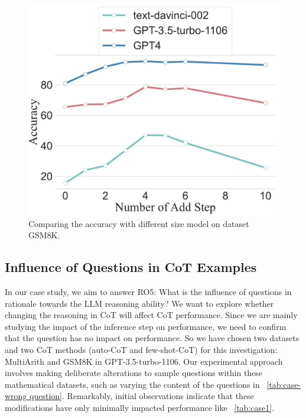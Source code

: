 \documentclass[11pt]{article}
\begin{document}
\begin{figure}[t]
    \centering
    \includegraphics[width=0.75\linewidth]{DIFF_MODEL.pdf}

    \caption{Comparing the accuracy with different size model on dataset GSM8K.}
    \label{diff_model}

\end{figure}


\phantom{Invisible Text}
\vspace{-\baselineskip}

\subsection{Influence of Questions in CoT Examples}

\label{section4.6}

In our case study, we aim to answer RO5: What is the influence of questions in rationale towards the LLM reasoning ability? We want to explore whether changing the reasoning in CoT will affect CoT performance. Since we are mainly studying the impact of the inference step on performance, we need to confirm that the question has no impact on performance. So we have chosen two datasets and two CoT methods (auto-CoT and few-shot-CoT) for this investigation: MultiArith \cite{roy2015solving} and GSM8K \cite{cobbe2021training} in GPT-3.5-turbo-1106. Our experimental approach involves making deliberate alterations to sample questions within these mathematical datasets, such as varying the content of the questions in ~\autoref{tab:case-wrong question}. Remarkably, initial observations indicate that these modifications have only minimally impacted performance like ~\autoref{tab:case1}.
\end{document}
